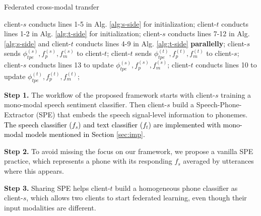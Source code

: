 \documentclass[11pt]{article}
\begin{document}
\setlength{\textfloatsep}{0pt}
\begin{algorithm}[ht]
\caption{Federated cross-modal transfer} 
\label{alg:framework} 
\begin{algorithmic}[1]
    \STATE client-$s$ conducts lines 1-5 in Alg. \ref{alg:s-side} for initialization;
    \STATE client-$t$ conducts lines 1-2 in Alg. \ref{alg:t-side} for initialization;
        \STATE client-$s$ conducts lines 7-12 in Alg. \ref{alg:s-side} and client-$t$ conducts lines 4-9 in Alg. \ref{alg:t-side} \textbf{parallelly};
        \STATE client-$s$ sends ${\phi}_{tpe}^{(s)}, {f}_{p}^{(s)}, {f}_m^{(s)}$ to client-$t$;
        \STATE client-$t$ sends ${\phi}_{tpe}^{(t)}, {f}_{p}^{(t)}, {f}_m^{(t)}$ to client-$s$;
        \STATE client-$s$ conducts lines 13 to update ${\phi}_{tpe}^{(s)}, {f}_{p}^{(s)}, {f}_m^{(s)}$;
        \STATE client-$t$ conducts lines 10 to update ${\phi}_{tpe}^{(t)}, {f}_{p}^{(t)}, {f}_m^{(t)}$;
    \ENDWHILE
\end{algorithmic}
\end{algorithm} %

\textbf{Step 1.} The workflow of the proposed framework starts with client-$s$ training a mono-modal speech sentiment classifier. Then client-$s$ build a Speech-Phone-Extractor (SPE) that embeds the speech signal-level information to phonemes. \textcolor{black}{The speech classifier (${f}_s$) and text classifier (${f}_t$) are implemented with mono-modal models mentioned in Section \ref{sec:imp}.}

\textbf{Step 2.} To avoid missing the focus on our framework, we propose a vanilla SPE practice, which represents a phone with its responding $f_s$ averaged by utterances where this  appears. 

\textbf{Step 3.} Sharing SPE helps client-$t$ build a homogeneous phone classifier as client-$s$, which allows two clients to start federated learning, even though their input modalities are different. 
\end{document}
